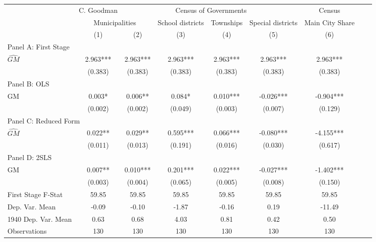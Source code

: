  \begin{tabular}{l*{8}{c}} \toprule
&\multicolumn{1}{c}{C. Goodman}&\multicolumn{4}{c}{Census of Governments}&\multicolumn{1}{c}{Census}\\\cmidrule(lr){2-2}\cmidrule(lr){3-6}\cmidrule(lr){7-7}
&\multicolumn{2}{c}{Municipalities}&\multicolumn{1}{c}{School districts}&\multicolumn{1}{c}{Townships}&\multicolumn{1}{c}{Special districts}&\multicolumn{1}{c}{Main City Share}\\\cmidrule(lr){2-3}\cmidrule(lr){4-6}\cmidrule(lr){7-7}
&\multicolumn{1}{c}{(1)}&\multicolumn{1}{c}{(2)}&\multicolumn{1}{c}{(3)}&\multicolumn{1}{c}{(4)}&\multicolumn{1}{c}{(5)}&\multicolumn{1}{c}{(6)}\\
\cmidrule(lr){1-7}
\multicolumn{6}{l}{Panel A: First Stage}\\
\cmidrule(lr){1-7}
$\widehat{GM}$  &    2.963***&    2.963***&    2.963***&    2.963***&    2.963***&    2.963***\\
                &  (0.383)   &  (0.383)   &  (0.383)   &  (0.383)   &  (0.383)   &  (0.383)   \\
\cmidrule(lr){1-7}
\multicolumn{6}{l}{Panel B: OLS}\\
\cmidrule(lr){1-7}
GM              &    0.003*  &    0.006** &    0.084*  &    0.010***&   -0.026***&   -0.904***\\
                &  (0.002)   &  (0.002)   &  (0.049)   &  (0.003)   &  (0.007)   &  (0.129)   \\
\cmidrule(lr){1-7}
\multicolumn{6}{l}{Panel C: Reduced Form}\\
\cmidrule(lr){1-7}
$\widehat{GM}$  &    0.022** &    0.029** &    0.595***&    0.066***&   -0.080***&   -4.155***\\
                &  (0.011)   &  (0.013)   &  (0.191)   &  (0.016)   &  (0.030)   &  (0.617)   \\
\cmidrule(lr){1-7}
\multicolumn{6}{l}{Panel D: 2SLS}\\
\cmidrule(lr){1-7}
GM              &    0.007** &    0.010***&    0.201***&    0.022***&   -0.027***&   -1.402***\\
                &  (0.003)   &  (0.004)   &  (0.065)   &  (0.005)   &  (0.008)   &  (0.150)   \\
\midrule
First Stage F-Stat&    59.85   &    59.85   &    59.85   &    59.85   &    59.85   &    59.85   \\
Dep. Var. Mean  &    -0.09   &    -0.10   &    -1.87   &    -0.16   &     0.19   &   -11.49   \\
1940 Dep. Var. Mean&     0.63   &     0.68   &     4.03   &     0.81   &     0.42   &     0.50   \\
Observations    &      130   &      130   &      130   &      130   &      130   &      130   \\
       \bottomrule \end{tabular}

